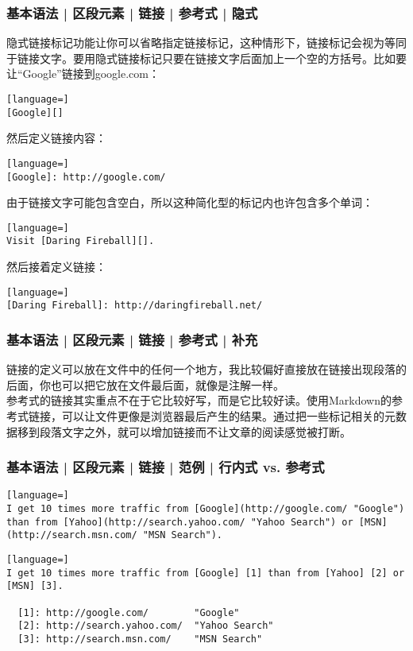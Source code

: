 \begin{frame}[fragile]
  \frametitle{基本语法 | 区段元素 | 链接 | 参考式 | 隐式}
隐式链接标记功能让你可以省略指定链接标记，这种情形下，链接标记会视为等同于链接文字。要用隐式链接标记只要在链接文字后面加上一个空的方括号。比如要让“Google”链接到google.com：
\begin{lstlisting}[language=]
[Google][]
\end{lstlisting}
然后定义链接内容：
\begin{lstlisting}[language=]
[Google]: http://google.com/
\end{lstlisting}
\pause
由于链接文字可能包含空白，所以这种简化型的标记内也许包含多个单词：
\begin{lstlisting}[language=]
Visit [Daring Fireball][].
\end{lstlisting}
然后接着定义链接：
\begin{lstlisting}[language=]
[Daring Fireball]: http://daringfireball.net/
\end{lstlisting}
\end{frame}

\begin{frame}
  \frametitle{基本语法 | 区段元素 | 链接 | 参考式 | 补充}
链接的定义可以放在文件中的任何一个地方，我比较偏好直接放在链接出现段落的后面，你也可以把它放在文件最后面，就像是注解一样。\\
  \vspace{1em}
参考式的链接其实重点不在于它比较好写，而是它比较好读。使用Markdown的参考式链接，可以让文件更像是浏览器最后产生的结果。通过把一些标记相关的元数据移到段落文字之外，就可以增加链接而不让文章的阅读感觉被打断。
\end{frame}

\begin{frame}[fragile]
  \frametitle{基本语法 | 区段元素 | 链接 | 范例 | 行内式 vs. 参考式}
\begin{lstlisting}[language=]
I get 10 times more traffic from [Google](http://google.com/ "Google") than from [Yahoo](http://search.yahoo.com/ "Yahoo Search") or [MSN](http://search.msn.com/ "MSN Search").
\end{lstlisting}
\pause
\begin{lstlisting}[language=]
I get 10 times more traffic from [Google] [1] than from [Yahoo] [2] or [MSN] [3].

  [1]: http://google.com/        "Google"
  [2]: http://search.yahoo.com/  "Yahoo Search"
  [3]: http://search.msn.com/    "MSN Search"
\end{lstlisting}
\end{frame}

